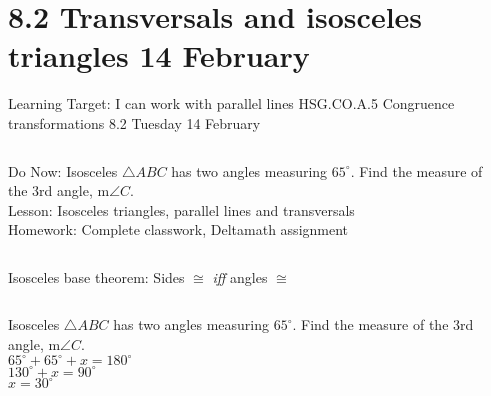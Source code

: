 \section{8.2 Transversals and isosceles triangles \hfill 14 February \,}
\begin{frame}{Learning Target: I can work with parallel lines}
  {HSG.CO.A.5 Congruence transformations \hfill \alert{8.2 Tuesday 14 February}}
  \begin{columns}
    Do Now: Isosceles $\triangle ABC$ has two angles measuring $65^\circ$. Find the measure of the 3rd angle, m$\angle C$.\\[0.5cm]
    Lesson: Isosceles triangles, parallel lines and transversals \\
    Homework: Complete classwork, Deltamath assignment
    \begin{flushright}
    \end{flushright}
  \end{columns}
\end{frame}

\begin{frame}{Isosceles base theorem: Sides $\cong$ \emph{iff} angles $\cong$}
  \begin{columns}
    Isosceles $\triangle ABC$ has two angles measuring $65^\circ$. Find the measure of the 3rd angle, m$\angle C$.\\[0.5cm]
    $65^\circ+65^\circ+x=180^\circ$ \\
    $130^\circ+x=90^\circ$ \\
    $x=30^\circ$
    \begin{flushright}
    \end{flushright}
  \end{columns}
\end{frame}

